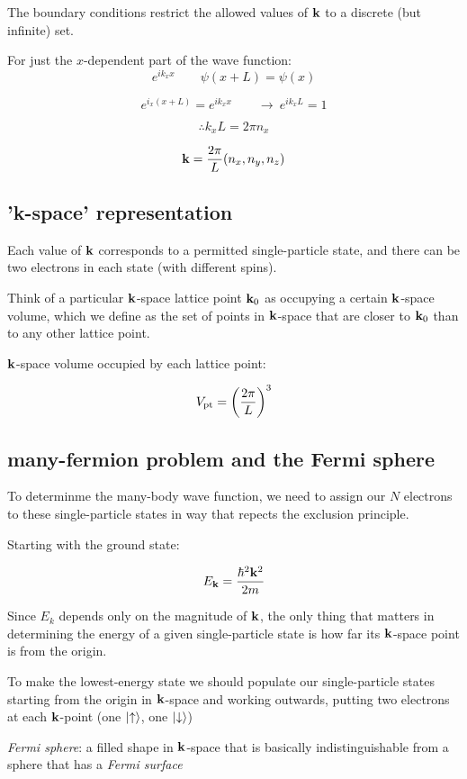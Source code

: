 \documentclass[10pt, a4paper, twocolumn]{article}
\newcommand{\deff}[1]{\par \noindent \textit{#1}: }
\newcommand{\arr}{\ensuremath{\longrightarrow\ }}
\begin{document}
The boundary conditions restrict the allowed values of $\vb k$ to a discrete (but infinite) set.

For just the $x$-dependent part of the wave function:
\[ e^{i k_x x} \qquad \psi (x + L) = \psi (x) \]

\[e^{i_x(x+L)} = e^{ik_xx} \qquad \arr e^{ik_xL} = 1 \]

\[\therefore k_x L = 2 \pi n_x \]

\[ \vb k = \frac{2 \pi}{L} (n_x, n_y, n_z) \]

\subsection{'k-space' representation}

Each value of $\vb k$ corresponds to a permitted single-particle state, and there can be two electrons in each state (with different spins).

Think of a particular $\vb k$-space lattice point $\vb k _0$ as occupying a certain $\vb k$-space volume, which we define as the set of points in $\vb k$-space that are closer to $\vb k_0$ than to any other lattice point.

$\vb k$-space volume occupied by each lattice point:

\[ V _\mathrm{pt} = \qty( \frac{2\pi}{L} )^3 \]

\subsection{many-fermion problem and the Fermi sphere}

To determinme the many-body wave function, we need to assign our $N$ electrons to these single-particle states in way that repects the exclusion principle.

Starting with the ground state:

\[ E_{\vb k} = \frac{\hbar ^2 \vb k^2}{2m} \]

Since  $E_k$ depends only on the magnitude of $\vb k$, the only thing that matters in determining the energy of a given single-particle state is how far its $\vb k$-space point is from the origin.

To make the lowest-energy state we should populate our single-particle states starting from the origin in $\vb k$-space and working outwards, putting two electrons at each $\vb k$-point
(one $\ket{\uparrow}$, one $\ket{\downarrow}$)

\deff{Fermi sphere}
a filled shape in $\vb k$-space that is basically indistinguishable from a sphere that has a \emph{Fermi surface}
\end{document}
